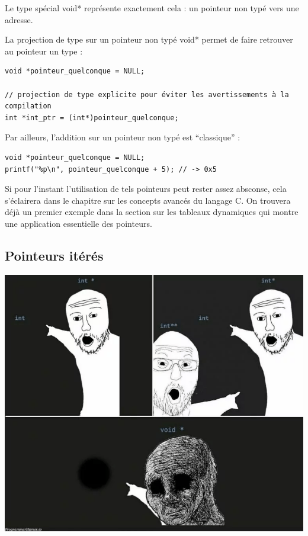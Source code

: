 \documentclass[../../../main.tex]{subfiles}
\begin{document}
Le type spécial \textsf{void*} représente exactement cela : un pointeur non typé vers une adresse.
 
La projection de type sur un pointeur non typé \textsf{void*} permet de faire retrouver au pointeur un type :
\begin{verbatim}
void *pointeur_quelconque = NULL;

// projection de type explicite pour éviter les avertissements à la compilation
int *int_ptr = (int*)pointeur_quelconque; 
\end{verbatim}
Par ailleurs, l'addition sur un pointeur non typé est ``classique'' :
\begin{verbatim}
void *pointeur_quelconque = NULL;
printf("%p\n", pointeur_quelconque + 5); // -> 0x5
\end{verbatim}
Si pour l'instant l'utilisation de tels pointeurs peut rester assez absconse, cela s'éclairera dans le chapitre sur les concepts avancés du langage C. On trouvera déjà un premier exemple dans la section sur les tableaux dynamiques qui montre une application essentielle des pointeurs.
\subsection{Pointeurs itérés}
\begin{minipage}{\textwidth}
	\begin{center}
		\includegraphics[width=.75\textwidth]{pointer_meme}
	\end{center}
\end{minipage}
\end{document}
